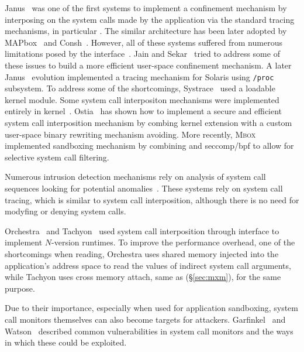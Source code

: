 Janus~\cite{wily-hacker} was one of the first systems to implement a confinement
mechanism by interposing on the system calls made by the application via the
standard tracing mechanisms, in particular \ptrace. The similar architecture
has been later adopted by MAPbox~\cite{mapbox} and Consh~\cite{consh}. However,
all of these systems suffered from numerous limitations posed by the \ptrace
interface~\cite{janus}. Jain and Sekar~\cite{jain1999} tried to address some of
these issues to build a more efficient user-space confinement mechanism.  A
later Janus~\cite{janus} evolution implemented a tracing mechanism for Solaris
using \lstinline`/proc` subsystem. To address some of the \ptrace shortcomings,
Systrace~\cite{provos2002} used a loadable kernel module.  Some system call
interpositon mechanisms were implemented entirely in
kernel~\cite{subdomain,cots-hardening}. Ostia~\cite{ostia} has shown how to
implement a secure and efficient system call interposition mechanism by combing
kernel extension with a custom user-space binary rewriting mechanism avoiding.
More recently, \textsc{Mbox}~\cite{mbox} implemented sandboxing mechanism by
combining \ptrace and \textsf{seccomp/bpf} to allow for selective system call
filtering.

Numerous intrusion detection mechanisms rely on analysis of system call
sequences looking for potential
anomalies~\cite{syscall-seq,wespi00,sekar01,gao04,sandeep06}. These systems
rely on system call tracing, which is similar to system call interposition,
although there is no need for modyfing or denying system calls.

Orchestra~\cite{orchestra09} and Tachyon~\cite{tachyon12} used system call
interposition through \ptrace interface to implement $N$-version runtimes.  To
improve the performance overhead, one of the \ptrace shortcomings when reading,
Orchestra uses shared memory injected into the application's address space to
read the values of indirect system call arguments, while Tachyon uses cross
memory attach, same as \mx (\S\ref{sec:mxm}), for the same purpose.

Due to their importance, especially when used for application sandboxing,
system call monitors themselves can also become targets for attackers.
Garfinkel~\cite{garfinkel:traps} and Watson~\cite{watson07} described common
vulnerabilities in system call monitors and the ways in which these could be
exploited.


